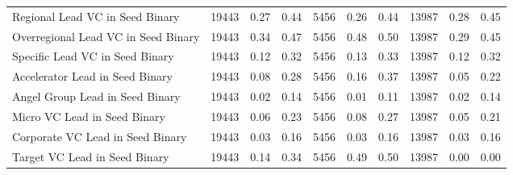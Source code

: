 {\begin{table}[!h]
{\begin{tabular}[t]{lrrrrrrrrr}
Regional Lead VC in Seed Binary & 19443 & 0.27 & 0.44 & 5456 & 0.26 & 0.44 & 13987 & 0.28 & 0.45\\
Overregional Lead VC in Seed Binary & 19443 & 0.34 & 0.47 & 5456 & 0.48 & 0.50 & 13987 & 0.29 & 0.45\\
Specific Lead VC in Seed Binary & 19443 & 0.12 & 0.32 & 5456 & 0.13 & 0.33 & 13987 & 0.12 & 0.32\\
Accelerator Lead in Seed Binary & 19443 & 0.08 & 0.28 & 5456 & 0.16 & 0.37 & 13987 & 0.05 & 0.22\\
\addlinespace
Angel Group Lead in Seed Binary & 19443 & 0.02 & 0.14 & 5456 & 0.01 & 0.11 & 13987 & 0.02 & 0.14\\
Micro VC Lead in Seed Binary & 19443 & 0.06 & 0.23 & 5456 & 0.08 & 0.27 & 13987 & 0.05 & 0.21\\
Corporate VC Lead in Seed Binary & 19443 & 0.03 & 0.16 & 5456 & 0.03 & 0.16 & 13987 & 0.03 & 0.16\\
Target VC Lead in Seed Binary & 19443 & 0.14 & 0.34 & 5456 & 0.49 & 0.50 & 13987 & 0.00 & 0.00\\
\bottomrule
\end{tabular}}
\end{table}
}
